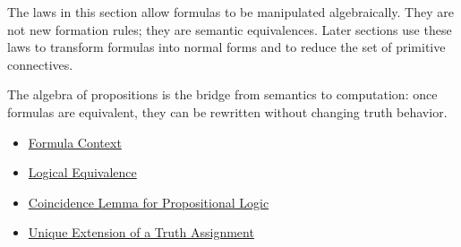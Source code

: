 \begin{remark*}[Exposition]
The laws in this section allow formulas to be manipulated algebraically. They are not new formation rules; they are semantic equivalences. Later sections use these laws to transform formulas into normal forms and to reduce the set of primitive connectives.
\end{remark*}

\begin{remark*}[Exposition]
The algebra of propositions is the bridge from semantics to computation: once formulas are equivalent, they can be rewritten without changing truth behavior.
\end{remark*}

\begin{dependencies}
\begin{itemize}
  \item \hyperref[def:formula-context-propositional-logic]{Formula Context}
  \item \hyperref[def:logical-equivalence-propositional-logic]{Logical Equivalence}
  \item \hyperref[lem:coincidence-lemma-propositional-logic]{Coincidence Lemma for Propositional Logic}
  \item \hyperref[thm:unique-extension-truth-assignment-propositional-logic]{Unique Extension of a Truth Assignment}
\end{itemize}
\end{dependencies}
